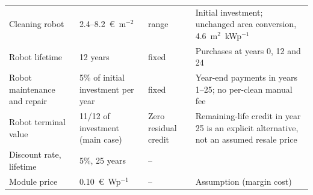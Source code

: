 \begin{table}[!t]
\begin{tabularx}{\textwidth}{p{3.6cm}p{3.0cm}p{2.3cm}X}
Cleaning robot & 2.4--8.2~\euro~m$^{-2}$ & range & Initial investment; unchanged area conversion, 4.6~m$^2$~kWp$^{-1}$ \cite{ilseTechnoEconomicAssessmentSoiling2019a} \\
\rowcolor{tabgrey} Robot lifetime & 12 years & fixed & Purchases at years 0, 12 and 24 \\
Robot maintenance and repair & 5\% of initial investment per year & fixed & Year-end payments in years 1--25; no per-clean manual fee \\
\rowcolor{tabgrey} Robot terminal value & 11/12 of investment (main case) & Zero residual credit & Remaining-life credit in year 25 is an explicit alternative, not an assumed resale price \\
Discount rate, lifetime & 5\%, 25 years & -- & \cite{ilseTechnoEconomicAssessmentSoiling2019a} \\
\rowcolor{tabgrey} Module price & 0.10~\euro~Wp$^{-1}$ & -- & Assumption (margin cost) \\
\bottomrule
\end{tabularx}
\end{table}
